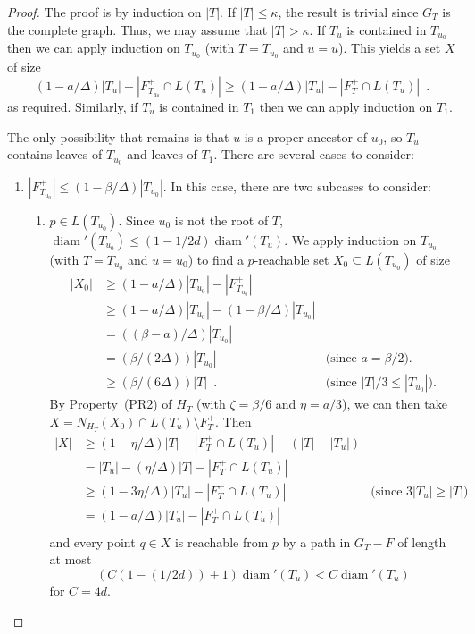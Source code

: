 \documentclass{patmorin}
\DeclareMathOperator{\diam}{diam}
\begin{document}
\begin{proof}
  The proof is by induction on $|T|$.  If $|T|\le\kappa$, the result
  is trivial since $G_T$ is the complete graph.  Thus, we may assume
  that $|T|>\kappa$.  If $T_u$ is contained in $T_{u_0}$ then we can
  apply induction on $T_{u_0}$ (with $T=T_{u_0}$ and $u=u$).   This yields a set $X$ of size
  \[
     (1-a/\Delta)|T_u|-|F^+_{T_{u_0}}\cap L(T_u)|
     \ge (1-a/\Delta)|T_u|-|F^+_{T}\cap L(T_u)| \enspace .
  \]
  as required. Similarly, if $T_u$ is contained in $T_1$ then we can
  apply induction on $T_1$.

  The only possibility that remains is that $u$ is a proper ancestor
  of $u_0$, so $T_u$ contains leaves of $T_{u_0}$ and leaves of $T_1$.
  There are several cases to consider:
  \begin{enumerate}
    \item $|F^+_{T_{u_0}}|\le (1-\beta/\Delta)|T_{u_0}|$. In this case, there are two subcases
    to consider:
    \begin{enumerate}
      \item $p\in L(T_{u_0})$.  Since $u_0$ is not the root of $T$,
      $\diam'(T_{u_0}) \le (1-1/2d)\diam'(T_u)$.  We apply
      induction on $T_{u_0}$ (with $T=T_{u_0}$ and $u=u_0$)
       to find a $p$-reachable set $X_0\subseteq L(T_{u_0})$ of size
      \begin{align*}
        |X_0| & \ge (1-a/\Delta)|T_{u_0}|-|F^+_{T_{u_0}}| \\
              & \ge (1-a/\Delta)|T_{u_0}|-(1-\beta/\Delta)|T_{u_0}| \\
              & = ((\beta-a)/\Delta)|T_{u_0}| \\
              & = (\beta/(2\Delta))|T_{u_0}|
              & \text{(since $a = \beta/2$).} \\
              & \ge (\beta/(6\Delta))|T| \enspace .
              & \text{(since $|T|/3\le |T_{u_0}|$).} 
      \end{align*}
      By Property~(PR2) of $H_T$ (with $\zeta = \beta/6$ and $\eta =
      a/3$), we can then take $X=N_{H_T}(X_0)\cap L(T_u)\setminus F^+_T $.  Then
      \begin{align*}
         |X| & \ge (1-\eta/\Delta)|T|-|F^+_T\cap L(T_u)| - (|T|-|T_u|) \\
             & = |T_u|-(\eta/\Delta)|T|-|F^+_T\cap L(T_u)| \\
             & \ge (1-3\eta/\Delta)|T_u|-|F^+_T\cap L(T_u)| 
                & \text{(since $3|T_u|\ge |T|$)}\\
             & = (1-a/\Delta)|T_u|-|F^+_T\cap L(T_u)| \\
      \end{align*} 
      and every point $q\in X$ is reachable from $p$ by a path in $G_T-F$
      of length at most
        \[ (C(1-(1/2d))+1)\diam'(T_{u}) < C\diam'(T_u) \]
      for $C= 4d$.


\end{enumerate}
\end{enumerate}
\end{proof}
\end{document}
